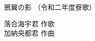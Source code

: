 \documentclass[10pt,b5j]{tarticle} %
\begin{document}
\begin{minipage}[c]{0.7\hsize} %
    \begin{center}
        {\LARGE
            鴉翼の影 %
        }
        {\small 
            （令和二年度寮歌） %
        }
    \end{center}
\end{minipage}
\begin{minipage}[c]{0.3\hsize} %
    \begin{flushright} %
        落合海宇君 作歌\\加納央都君 作曲 %
    \end{flushright}
\end{minipage}
\end{document}
